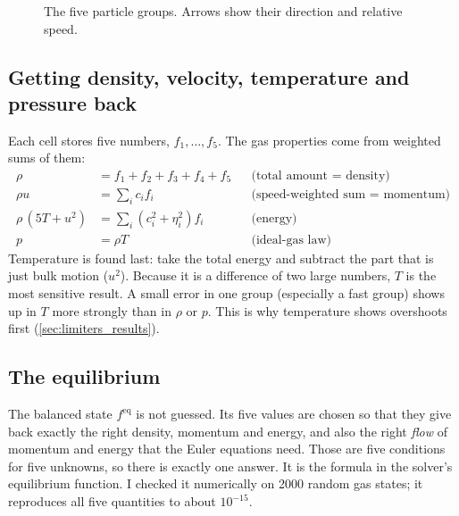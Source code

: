 \documentclass[11pt]{article}
\newcommand{\feq}{f^{\mathrm{eq}}}
\begin{document}
\begin{figure}[!htbp]
\centering
{}
\caption{The five particle groups.  Arrows show their direction and relative speed.}
\label{fig:velset}
\end{figure}

\subsection{Getting density, velocity, temperature and pressure back}
Each cell stores five numbers, $f_1,\dots,f_5$.  The gas properties come from
weighted sums of them:
\begin{align*}
  \rho &= f_1 + f_2 + f_3 + f_4 + f_5 &&\text{(total amount $=$ density)}\\
  \rho u &= \textstyle\sum_i c_i f_i &&\text{(speed-weighted sum $=$ momentum)}\\
  \rho\,(5T + u^2) &= \textstyle\sum_i (c_i^2 + \eta_i^2) f_i &&\text{(energy)}\\
  p &= \rho T &&\text{(ideal-gas law)}
\end{align*}
Temperature is found last: take the total energy and subtract the part that is just
bulk motion ($u^2$).  Because it is a difference of two large numbers, $T$ is the
most sensitive result.  A small error in one group (especially a fast group) shows
up in $T$ more strongly than in $\rho$ or $p$.  This is why temperature shows
overshoots first (\cref{sec:limiters_results}).

\subsection{The equilibrium}
The balanced state $\feq$ is not guessed.  Its five values are chosen so that they
give back exactly the right density, momentum and energy, and also the right
\emph{flow} of momentum and energy that the Euler equations need.  Those are five
conditions for five unknowns, so there is exactly one answer.  It is the formula in
the solver's equilibrium function.  I checked it numerically on 2000 random gas
states; it reproduces all five quantities to about $10^{-15}$.
\end{document}
